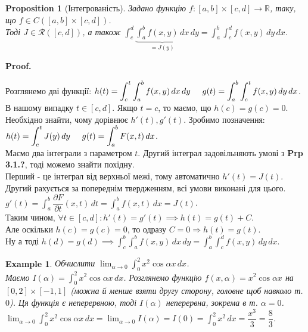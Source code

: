 \documentclass[a4paper, 10pt]{article}
\makeatletter
\def\departial#1#2{\dfrac{\partial {#1}}{\partial {#2}}}
\def\huge{\displaystyle}
\def\qed{$\blacksquare$}
\theoremstyle{theoremdd}
\theoremstyle{theoremdd}
\theoremstyle{theoremdd}
\theoremstyle{theoremdd}
\newtheorem{example}[theorem]{Example}
\theoremstyle{theoremdd}
\newtheorem{proposition}[theorem]{Proposition}
\theoremstyle{theoremdd}
\theoremstyle{theoremdd}
\theoremstyle{theoremdd}
\renewenvironment{proof}[1][Proof.\\]{\par
\pushQED{\hfill \qed}%
\normalfont \topsep6\p@\@plus6\p@\relax
\trivlist
\item\relax
{\bfseries
#1\@addpunct{.}}\hspace\labelsep\ignorespaces
}{%
\popQED\endtrivlist\@endpefalse
}
\makeatother
\begin{document}
\begin{proposition}[Інтегрованість]
Задано функцію $f: [a,b] \times [c,d] \to \mathbb{R}$, таку, що $f \in C([a,b] \times [c,d])$.\\
Тоді $J \in \mathcal{R}([c,d])$, а також $\huge \int_c^d \underbrace{\int_a^b f(x,y)\,dx}_{=J(y)}\,dy = \int_a^b \int_c^d f(x,y)\,dy \,dx$.
\end{proposition}

\begin{proof}
Розглянемо дві функції: $h(t) = \huge \int_c^t \int_a^b f(x,y) \,dx \,dy \hspace{0.5cm} g(t) = \int_a^b \int_c^t f(x,y)\,dy\,dx$. В нашому випадку $t \in [c,d]$. Якщо $t =c$, то маємо, що $h(c) = g(c) = 0$.\\
Необхідно знайти, чому дорівнює $h'(t), g'(t)$. Зробимо позначення: $h(t) = \huge \int_c^t J(y) \,dy \hspace{0.5cm} g(t) = \int_a^b F(x,t)\,dx$.\\
Маємо два інтеграли з параметром $t$. Другий інтеграл задовільняють умові з \textbf{Prp 3.1.?}, тоді можемо знайти похідну.\\
Перший - це інтеграл від верхньої межі, тому автоматично $h'(t) = J(t)$.\\
Другий рахується за попереднім твердженням, всі умови виконані для цього.\\
$g'(t) = \huge \int_a^b \departial{F}{t}(x,t)\,dt = \huge \int_a^b f(x,t)\,dx = J(t)$.\\
Таким чином, $\forall t \in [c,d]: h'(t) = g'(t) \implies h(t) = g(t) + C$.\\
Але оскільки $h(c)=g(c)=0$, то одразу $C=0 \Rightarrow h(t) = g(t)$.\\
Ну а тоді $h(d) = g(d) \implies \huge \int_c^b \int_a^b f(x,y)\,dx\,dy = \int_a^b \int_c^d f(x,y)\,dy \,dx$.
\end{proof}

\begin{example}
Обчислити $\huge \lim_{\alpha \to 0} \int_0^2 x^2 \cos \alpha x \,dx$.\\
Маємо $I(\alpha) = \huge\int_0^2 x^2 \cos \alpha x \,dx$. Розглянемо функцію $f(x,\alpha) = x^2 \cos \alpha x$ на $[0,2] \times [-1,1]$ (можна й менше взяти другу сторону, головне щоб навколо т. $0$). Ця функція є неперервною, тоді $I(\alpha)$ неперервна, зокрема в т. $\alpha = 0$.\\
$\huge \lim_{\alpha \to 0} \int_0^2 x^2 \cos \alpha x \,dx = \lim_{\alpha \to 0} I(\alpha) = I(0) = \int_0^2 x^2 \,dx = \dfrac{x^3}{3} = \dfrac{8}{3}$.
\end{example}
\end{document}
